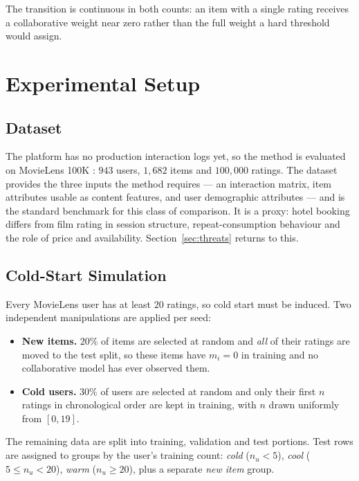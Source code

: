 \documentclass[conference]{IEEEtran}
\begin{document}
The transition is continuous in both counts: an item with a single
rating receives a collaborative weight near zero rather than the full
weight a hard threshold would assign.

\section{Experimental Setup}
\label{sec:setup}

\subsection{Dataset}


The platform has no production interaction logs yet, so the method
is evaluated on MovieLens 100K \cite{harper2015}: $943$ users,
$1{,}682$ items and $100{,}000$ ratings. The dataset provides the
three inputs the method requires --- an interaction matrix, item
attributes usable as content features, and user demographic
attributes --- and is the standard benchmark for this class of
comparison. It is a proxy: hotel booking differs from film rating in
session structure, repeat-consumption behaviour and the role of
price and availability. Section~\ref{sec:threats} returns to this.

\subsection{Cold-Start Simulation}

Every MovieLens user has at least $20$ ratings, so cold start must be
induced. Two independent manipulations are applied per seed:

\begin{itemize}
\item \textbf{New items.} $20\%$ of items are selected at random and
\emph{all} of their ratings are moved to the test split, so these
items have $m_i = 0$ in training and no collaborative model has ever
observed them.
\item \textbf{Cold users.} $30\%$ of users are selected at random and
only their first $n$ ratings in chronological order are kept in
training, with $n$ drawn uniformly from $[0, 19]$.
\end{itemize}

The remaining data are split into training, validation and test
portions. Test rows are assigned to groups by the user's training
count: \emph{cold} ($n_u < 5$), \emph{cool}
($5 \le n_u < 20$), \emph{warm} ($n_u \ge 20$), plus a separate
\emph{new item} group.
\end{document}
